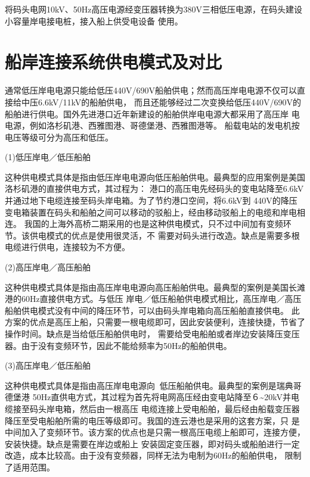 将码头电网10kV、50Hz高压电源经变压器转换为380V三相低压电源，在码头建设小容量岸电接电桩，接入船上供受电设备
使用。

\section{船岸连接系统供电模式及对比}

通常低压岸电电源只能给低压440V/690V船舶供电；然而高压岸电电源不仅可以直接给中压6.6kV/11kV的船舶供电，
而且还能够经过二次变换给低压440V/690V的船舶进行供电。国外先进港口近年新建设的船舶供岸电电源大都采用了高压岸
电电源，例如洛杉矶港、西雅图港、哥德堡港、西雅图港等。
船载电站的发电机按电压等级可分为高压和低压。

(1)低压岸电／低压船舶

这种供电模式具体是指由低压岸电电源向低压船舶供电。最典型的应用案例是美国洛杉矶港的直接供电方式，其过程为：
港口的高压电先经码头的变电站降至6.6kV并通过地下电缆连接至码头岸电箱。为了节约港口空间，将6.6kV到
440V的降压变电箱装置在码头和船舶之间可以移动的驳船上，经由移动驳船上的电缆和岸电相连。
我国的上海外高桥二期采用的也是这种供电模式，只不过中间加有变频环节。该供电模式的优点是使用很灵活，不
需要对码头进行改造。缺点是需要多根电缆进行供电，连接较为不方便。

(2)高压岸电／高压船舶

这种供电模式具体是指由高压岸电电源向高压船舶供电。最典型的案例是美国长滩港的60Hz直接供电方式。与低压
岸电／低压船舶供电模式相比，高压岸电／高压船舶供电模式没有中间的降压环节，可以由码头岸电箱向高压船舶直接供电。
此方案的优点是高压上船，只需要一根电缆即可，因此安装便利，连接快捷，节省了操作时间。缺点是当给低压船舶供电时，
需要给受电船舶或者岸边安装降压变压器。由于没有变频环节，因此不能给频率为50Hz的船舶供电。

(3)高压岸电／低压船舶

这种供电模式具体是指由高压岸电电源向低压船舶供电。最典型的案例是瑞典哥德堡港
50Hz直供电方式，其过程为首先将电网高压经由变电站降至６\~{}20kV并电缆接至码头岸电箱，然后由一根高压
电缆连接上受电船舶，最后经由船载变压器降压至受电船舶所需的电压等级即可。我国的连云港也是采用的这套方案，只
是中间加入了变频环节。该方案的优点也是只需一根高压电缆上船即可，连接方便，安装快捷。缺点是需要在岸边或船上
安装固定变压器，即对码头或船舶进行一定改造，成本比较高。由于没有变频器，同样无法为电制为60Hz的船舶供电，
限制了适用范围。

\begin{table}[!htp]
	\centering
	\caption[船用岸电供电方式比较]{船用岸电供电方式比较}
	\label{tab:船用岸电供电方式比较}
\end{table}


